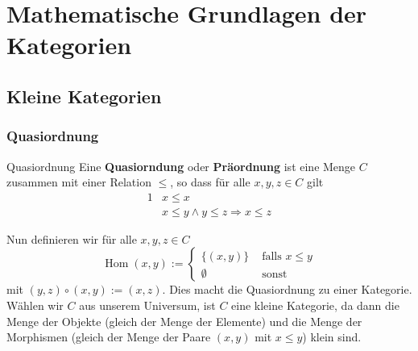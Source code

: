 \documentclass[a4paper]{amsart}
\theoremstyle{definition}
\DeclareMathOperator{\Hom}{Hom}
\begin{document}
\section{Mathematische Grundlagen der Kategorien}

\subsection{Kleine Kategorien}

\subsubsection{Quasiordnung}
\begin{Definition}{Quasiordnung}
   Eine \textbf{Quasiorndung} oder \textbf{Präordnung} ist eine Menge $C$ zusammen mit einer Relation $\le$, so dass für alle $x, y, z \in C$ gilt
   \begin{alignat}{1}
      &x \le x\\
      &x \le y \land y \le z \Rightarrow x \le z
   \end{alignat}
\end{Definition}

Nun definieren wir für alle $x, y, z \in C$
\begin{equation}
   \Hom(x,y) := \begin{cases}
      \{ (x,y) \} & \text{ falls } x \le y\\
      \emptyset & \text{ sonst }
   \end{cases}
\end{equation}
mit $(y,z) \circ (x,y) := (x,z)$. Dies macht die Quasiordnung zu einer Kategorie. Wählen wir $C$ aus unserem Universum, ist $C$ eine kleine Kategorie, da dann die Menge der Objekte (gleich der Menge der Elemente) und die Menge der Morphismen (gleich der Menge der Paare $(x,y)$ mit $x \le y$) klein sind.
\end{document}
